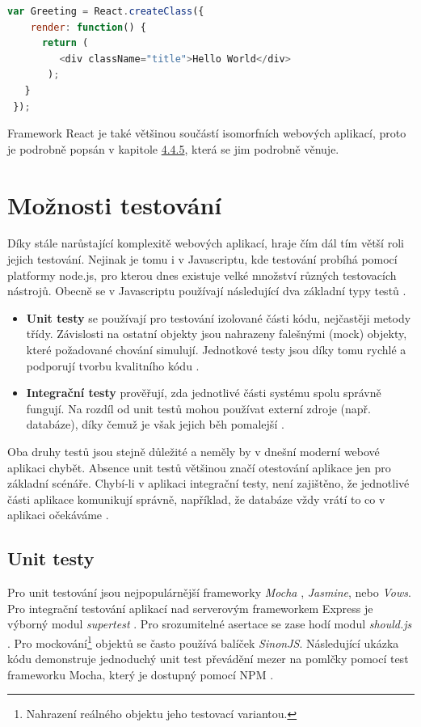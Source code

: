 \begin{lstlisting}[language=Javascript,caption={Ukázka definice Hello World komponenty v JSX}]
 var Greeting = React.createClass({
    render: function() {
      return (
         <div className="title">Hello World</div>
       );
   }
 });
\end{lstlisting}

Framework React je také většinou součástí isomorfních webových aplikací, proto je podrobně popsán v kapitole \hyperref[sec:react]{4.4.5}, která se jim podrobně věnuje.

\section{Možnosti testování}
Díky stále narůstající komplexitě webových aplikací, hraje čím dál tím větší roli jejich testování. 
Nejinak je tomu i v Javascriptu, kde testování probíhá pomocí platformy node.js, pro kterou dnes existuje velké množství různých testovacích nástrojů. Obecně se v Javascriptu používají následující dva základní typy testů \cite{zdrojak_jstesting} \cite{jstesting}.

\begin{itemize}
\item \textbf{Unit testy} se používají pro testování izolované části kódu, nejčastěji metody třídy. Závislosti na ostatní objekty jsou nahrazeny falešnými (mock) objekty, které požadované chování simulují. Jednotkové testy jsou díky tomu rychlé a podporují tvorbu kvalitního kódu \cite{zdrojak_jstesting}.
\item \textbf{Integrační testy} prověřují, zda jednotlivé části systému spolu správně fungují. Na rozdíl od unit testů mohou používat externí zdroje (např. databáze), díky čemuž je však jejich běh pomalejší \cite{zdrojak_jstesting}. 
\end{itemize}

\vspace{3mm}
Oba druhy testů jsou stejně důležité a neměly by v dnešní moderní webové aplikaci chybět. Absence unit testů většinou značí otestování aplikace jen pro základní scénáře. Chybí-li v aplikaci integrační testy, není zajištěno, že jednotlivé části aplikace komunikují správně, například, že databáze vždy vrátí to co v aplikaci očekáváme \cite{zdrojak_jstesting} \cite{jstesting}.
\subsection{Unit testy}
Pro unit testování jsou nejpopulárnější frameworky \textit{Mocha} \cite{mocha}, \textit{Jasmine}, nebo \textit{Vows}. Pro integrační testování aplikací nad serverovým frameworkem Express je výborný modul \textit{supertest} \cite{supertest}. Pro srozumitelné asertace se zase hodí modul \textit{should.js} \cite{should_js}. Pro mockování\footnote{Nahrazení reálného objektu jeho testovací variantou.} objektů se často používá balíček \textit{SinonJS}. Následující ukázka kódu demonstruje jednoduchý unit test převádění mezer na pomlčky pomocí test frameworku Mocha, který je dostupný pomocí NPM \cite{mocha} \cite{zdrojak_jstesting} \cite{jstesting}.


